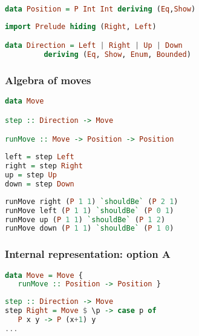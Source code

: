 \documentclass[10pt]{beamer}
\begin{document}
\begin{frame}[fragile]
\begin{lstlisting}[language=haskell, basicstyle=\ttfamily]
data Position = P Int Int deriving (Eq,Show)
\end{lstlisting}
\end{frame}
\begin{frame}[fragile]
\begin{lstlisting}[language=haskell, basicstyle=\ttfamily]
import Prelude hiding (Right, Left)

data Direction = Left | Right | Up | Down
         deriving (Eq, Show, Enum, Bounded)

\end{lstlisting}
\end{frame}
\begin{frame}[fragile]
  \frametitle{Algebra of moves}
  \begin{lstlisting}[language=haskell, basicstyle=\ttfamily]
data Move

step :: Direction -> Move

runMove :: Move -> Position -> Position
\end{lstlisting}
\end{frame}
\begin{frame}[fragile]
\begin{lstlisting}[language=haskell, basicstyle=\ttfamily]
left = step Left
right = step Right
up = step Up
down = step Down
\end{lstlisting}
\end{frame}
\begin{frame}[fragile]
\begin{lstlisting}[language=haskell, basicstyle=\ttfamily]
runMove right (P 1 1) `shouldBe` (P 2 1)
runMove left (P 1 1) `shouldBe` (P 0 1)
runMove up (P 1 1) `shouldBe` (P 1 2)
runMove down (P 1 1) `shouldBe` (P 1 0)
\end{lstlisting}
\end{frame}
\begin{frame}[fragile]
  \frametitle{Internal representation: option A}
\begin{lstlisting}[language=haskell, basicstyle=\ttfamily]
data Move = Move {
   runMove :: Position -> Position }

\end{lstlisting}
\end{frame}
\begin{frame}[fragile]
  \begin{lstlisting}[language=haskell, basicstyle=\ttfamily]
step :: Direction -> Move
step Right = Move $ \p -> case p of
   P x y -> P (x+1) y
...
\end{lstlisting}
\end{frame}
\end{document}

